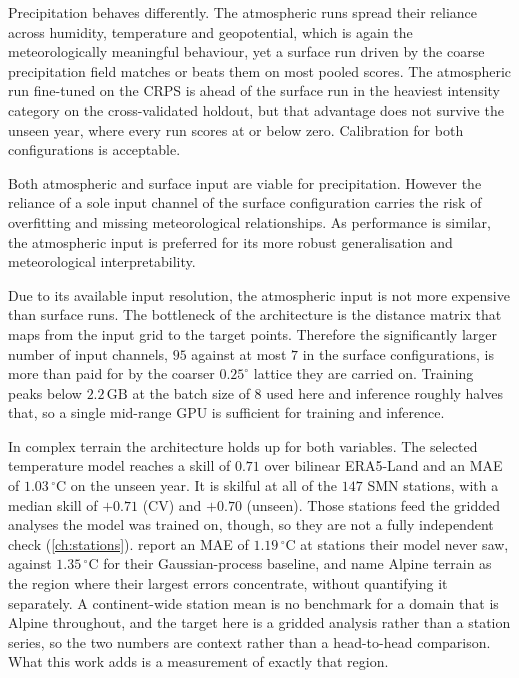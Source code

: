 Precipitation behaves differently. The atmospheric runs spread their reliance across humidity,
temperature and geopotential, which is again the meteorologically meaningful behaviour, yet a
surface run driven by the coarse precipitation field matches or beats them on most pooled scores.
The atmospheric run fine-tuned on the CRPS is ahead of the surface run in the heaviest intensity
category on the cross-validated holdout, but that advantage does not survive the unseen year, where
every run scores at or below zero. Calibration for both configurations is acceptable.

Both atmospheric and surface input are viable for precipitation. However the reliance of a sole input channel of the surface configuration carries the risk of overfitting and missing meteorological relationships. As performance is similar, the atmospheric input is preferred for its more robust generalisation and meteorological interpretability.


Due to its available input resolution, the atmospheric input is not more expensive than surface runs. The bottleneck of the architecture is the distance matrix that maps from the input grid to the target points.
Therefore the significantly larger number of input channels, $95$ against at most $7$ in the
surface configurations, is more than paid for by the coarser $0.25^{\circ}$ lattice they are
carried on. Training peaks
below $2.2\,\mathrm{GB}$ at the batch size of $8$ used here and inference roughly halves that, so a single
mid-range GPU is sufficient for training and inference.

In complex terrain the architecture holds up for both variables. The selected temperature model
reaches a skill of $0.71$ over bilinear ERA5-Land and an MAE of $1.03\,^{\circ}\mathrm{C}$ on the
unseen year. It is skilful at all of the $147$ SMN stations, with a median skill of $+0.71$ (CV) and
$+0.70$ (unseen). Those stations feed the gridded analyses the model was
trained on, though, so they are not a fully independent check (\cref{ch:stations}).
\textcite{vaughan2022convcnp} report an MAE of $1.19\,^{\circ}\mathrm{C}$ at stations their model
never saw, against $1.35\,^{\circ}\mathrm{C}$ for their Gaussian-process baseline, and name Alpine
terrain as the region where their largest errors concentrate, without quantifying it separately. A
continent-wide station mean is no benchmark for a domain that is Alpine throughout, and the target
here is a gridded analysis rather than a station series, so the two numbers are context rather than
a head-to-head comparison. What this work adds is a measurement of exactly that region.

